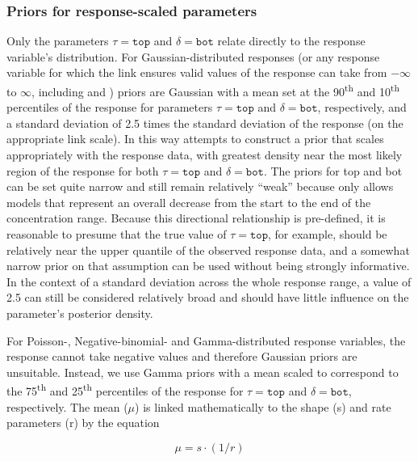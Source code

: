 \documentclass[
  shortnames]{jss}
\begin{document}
\hypertarget{priors-for-response-scaled-parameters}{%
\subsubsection{Priors for response-scaled parameters}\label{priors-for-response-scaled-parameters}}

Only the parameters \(\tau = \mathtt{top}\) and \(\delta = \mathtt{bot}\) relate directly to the response variable's distribution. For Gaussian-distributed responses (or any response variable for which the link ensures valid values of the response can take from \(-\infty\) to \(\infty\), including  and ) priors are Gaussian with a mean set at the 90\textsuperscript{th} and 10\textsuperscript{th} percentiles of the response for parameters \(\tau = \mathtt{top}\) and \(\delta = \mathtt{bot}\), respectively, and a standard deviation of 2.5 times the standard deviation of the response (on the appropriate link scale). In this way  attempts to construct a prior that scales appropriately with the response data, with greatest density near the most likely region of the response for both \(\tau = \mathtt{top}\) and \(\delta = \mathtt{bot}\). The priors for top and bot can be set quite narrow and still remain relatively ``weak'' because  only allows models that represent an overall decrease from the start to the end of the concentration range. Because this directional relationship is pre-defined, it is reasonable to presume that the true value of \(\tau = \mathtt{top}\), for example, should be relatively near the upper quantile of the observed response data, and a somewhat narrow prior on that assumption can be used without being strongly informative. In the context of a standard deviation across the whole response range, a value of 2.5 can still be considered relatively broad and should have little influence on the parameter's posterior density.

For Poisson-, Negative-binomial- and Gamma-distributed response variables, the response cannot take negative values and therefore Gaussian priors are unsuitable. Instead, we use Gamma priors with a mean scaled to correspond to the 75\textsuperscript{th} and 25\textsuperscript{th} percentiles of the response for \(\tau = \mathtt{top}\) and \(\delta = \mathtt{bot}\), respectively. The mean (\(\mu\)) is linked mathematically to the shape (s) and rate parameters (r) by the equation \citep{Becker1988}

\[ \mu = s \cdot (1 / r) \]
\end{document}
